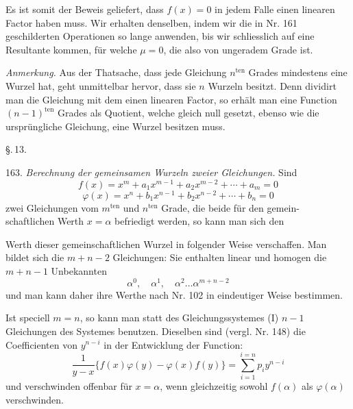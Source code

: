 Es ist somit der Beweis geliefert, dass $f(x) = 0$ in jedem Falle
einen linearen Factor haben muss. Wir erhalten denselben, indem
wir die in Nr. 161 geschilderten Operationen so lange anwenden, bis
wir schliesslich auf eine Resultante kommen, für welche $\mu = 0$, die
also von ungeradem Grade ist.

\textit{Anmerkung.} Aus der Thatsache, dass jede Gleichung $n^{\text{ten}}$ Grades
mindestens eine Wurzel hat, geht unmittelbar hervor, dass sie $n$
Wurzeln besitzt. Denn dividirt man die Gleichung mit dem einen
linearen Factor, so erhält man eine Function $(n-1)^{\text{ten}}$ Grades als
Quotient, welche gleich null gesetzt, ebenso wie die ursprüngliche
Gleichung, eine Wurzel besitzen muss.

\begin{center}
\S.\,13.\\
\end{center}

163. \textit{Berechnung der gemeinsamen Wurzeln zweier Gleichungen.}
Sind
\[ f(x) = x^m + a_1x^{m-1} + a_2x^{m-2} + \cdots + a_m = 0 \]
\[ \varphi(x) = x^n + b_1x^{n-1} + b_2x^{n-2} + \cdots + b_n = 0 \]
zwei Gleichungen vom $m^{\text{ten}}$ und $n^{\text{ten}}$ Grade, die beide für den gemein-
schaftlichen Werth $x = \alpha$ befriedigt werden, so kann man sich den


Werth dieser gemeinschaftlichen Wurzel in folgender Weise verschaffen. Man bildet sich die $m+n-2$ Gleichungen:
Sie enthalten linear und homogen die $m+n-1$ Unbekannten
\[
\alpha^0, \quad \alpha^1, \quad \alpha^2 \ldots \alpha^{m+n-2}
\]
und man kann daher ihre Werthe nach Nr. 102 in eindeutiger Weise bestimmen.

Ist speciell $m=n$, so kann man statt des Gleichungssystemes (I) $n-1$ Gleichungen des Systemes
benutzen. Dieselben sind (vergl. Nr. 148) die Coefficienten von $y^{n-i}$ in der Entwicklung der Function:
\[
\frac{1}{y-x}\{f(x)\varphi(y) - \varphi(x)f(y)\} = \sum_{i=1}^{i=n} p_i y^{n-i}
\]
und verschwinden offenbar für $x=\alpha$, wenn gleichzeitig sowohl $f(\alpha)$ als $\varphi(\alpha)$ verschwinden.

